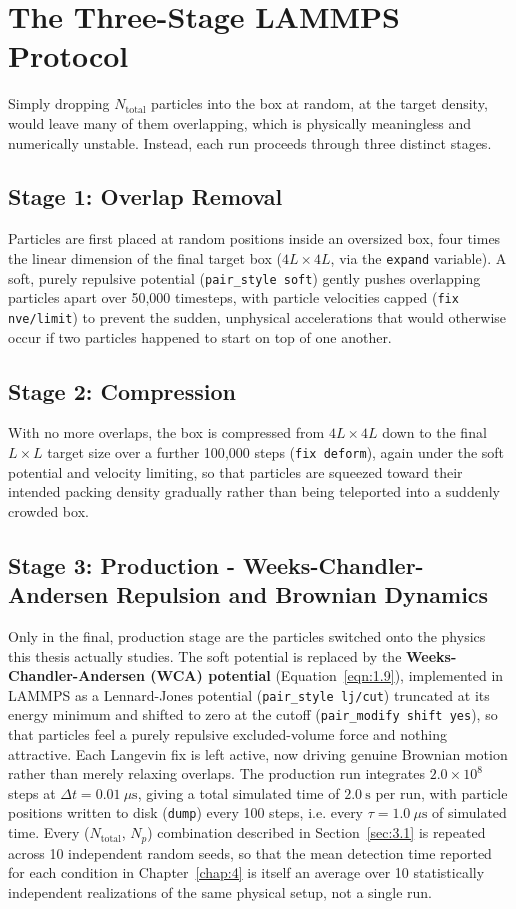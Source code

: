 \section{The Three-Stage LAMMPS Protocol}
\label{sec:3.6}
Simply dropping $N_\text{total}$ particles into the box at random, at the target density, would leave many of them overlapping, which is physically meaningless and numerically unstable. Instead, each run proceeds through three distinct stages.

\subsection{Stage 1: Overlap Removal}
\label{sec:3.6.1}
Particles are first placed at random positions inside an oversized box, four times the linear dimension of the final target box ($4L \times 4L$, via the \texttt{expand} variable). A soft, purely repulsive potential (\texttt{pair\_style soft}) gently pushes overlapping particles apart over 50,000 timesteps, with particle velocities capped (\texttt{fix nve/limit}) to prevent the sudden, unphysical accelerations that would otherwise occur if two particles happened to start on top of one another.

\subsection{Stage 2: Compression} 
\label{sec:3.6.2}
With no more overlaps, the box is compressed from $4L \times 4L$ down to the final $L \times L$ target size over a further 100{,}000 steps (\texttt{fix deform}), again under the soft potential and velocity limiting, so that particles are squeezed toward their intended packing density gradually rather than being teleported into a suddenly crowded box.


\subsection{Stage 3: Production - Weeks-Chandler-Andersen Repulsion and Brownian Dynamics}
\label{sec:3.6.3}
Only in the final, production stage are the particles switched onto the physics this thesis actually studies. The soft potential is replaced by the \textbf{Weeks-Chandler-Andersen (WCA) potential} (Equation~\ref{eqn:1.9}), implemented in LAMMPS as a Lennard-Jones potential (\texttt{pair\_style lj/cut}) truncated at its energy minimum and shifted to zero at the cutoff (\texttt{pair\_modify shift yes}), so that particles feel a purely repulsive excluded-volume force and nothing attractive. Each Langevin fix is left active, now driving genuine Brownian motion rather than merely relaxing overlaps. The production run integrates $2.0 \times 10^{8}$ steps at $\Delta t = 0.01~\mu\text{s}$, giving a total simulated time of $2.0~\text{s}$ per run, with particle positions written to disk (\texttt{dump}) every 100 steps, i.e. every $\tau = 1.0~\mu\text{s}$ of simulated time. Every ($N_\text{total}$, $N_p$) combination described in Section~\ref{sec:3.1} is repeated across 10 independent random seeds, so that the mean detection time reported for each condition in Chapter~\ref{chap:4} is itself an average over 10 statistically independent realizations of the same physical setup, not a single run.

